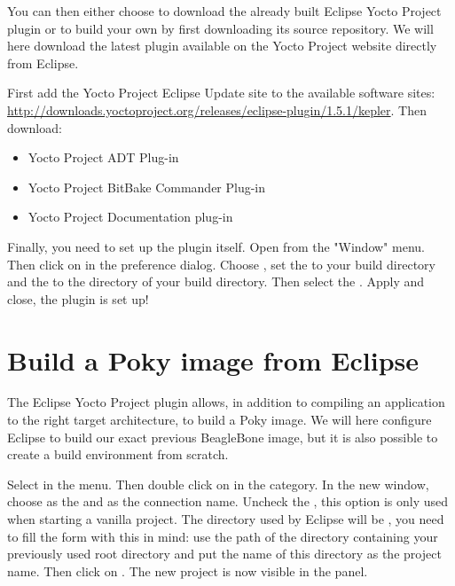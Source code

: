 You can then either choose to download the already built Eclipse Yocto Project
plugin or to build your own by first downloading its source repository. We will
here download the latest plugin available on the Yocto Project website directly
from Eclipse.

First add the Yocto Project Eclipse Update site to the available software sites:
\url{http://downloads.yoctoproject.org/releases/eclipse-plugin/1.5.1/kepler}.
Then download:
\begin{itemize}
  \item Yocto Project ADT Plug-in
  \item Yocto Project BitBake Commander Plug-in
  \item Yocto Project Documentation plug-in
\end{itemize}

Finally, you need to set up the plugin itself. Open  from the
"Window" menu. Then click on  in the preference dialog.
Choose , set the  to your build directory and the  to the
 directory of your build directory. Then select the
. Apply and close, the plugin is set up!

\section{Build a Poky image from Eclipse}

The Eclipse Yocto Project plugin allows, in addition to compiling an application
to the right target architecture, to build a Poky image. We will here configure
Eclipse to build our exact previous BeagleBone image, but it is also possible to
create a build environment from scratch.

Select  in the  menu. Then double click on  in the  category. In the new
window, choose  as the  and
 as the connection name. Uncheck the , this option is only used when starting a
vanilla project. The directory used by Eclipse will be , you need to fill the form with this in mind: use the path of the
directory containing your previously used  root directory and put
the name of this directory as the project name. Then click on .
The new project is now visible in the  panel.

